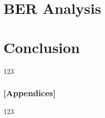 \documentclass{article}
\begin{document}
\part{BER Analysis}

\part{Conclusion}
123




\section{[Appendices]}
123


	
\end{document}
